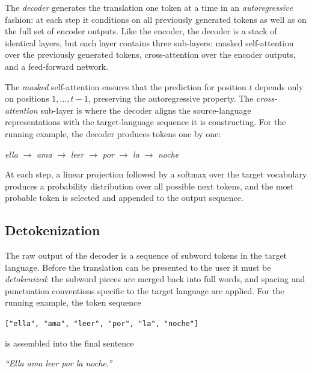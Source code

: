 The \emph{decoder} generates the translation one token at a time in an \emph{autoregressive} fashion: at each step it conditions on all previously generated tokens as well as on the full set of encoder outputs. Like the encoder, the decoder is a stack of identical layers, but each layer contains three sub-layers: masked self-attention over the previously generated tokens, cross-attention over the encoder outputs, and a feed-forward network.

The \emph{masked} self-attention ensures that the prediction for position $t$ depends only on positions $1, \ldots, t-1$, preserving the autoregressive property. The \emph{cross-attention} sub-layer is where the decoder aligns the source-language representations with the target-language sequence it is constructing. For the running example, the decoder produces tokens one by one:

\begin{center}
\textit{ella} $\rightarrow$ \textit{ama} $\rightarrow$ \textit{leer} $\rightarrow$ \textit{por} $\rightarrow$ \textit{la} $\rightarrow$ \textit{noche}
\end{center}

\noindent At each step, a linear projection followed by a softmax over the target vocabulary produces a probability distribution over all possible next tokens, and the most probable token is selected and appended to the output sequence.

\subsection{Detokenization}

The raw output of the decoder is a sequence of subword tokens in the target language. Before the translation can be presented to the user it must be \emph{detokenized}: the subword pieces are merged back into full words, and spacing and punctuation conventions specific to the target language are applied. For the running example, the token sequence

\begin{center}
\texttt{["ella", "ama", "leer", "por", "la", "noche"]}
\end{center}

\noindent is assembled into the final sentence

\begin{center}
\textit{``Ella ama leer por la noche.''}
\end{center}

